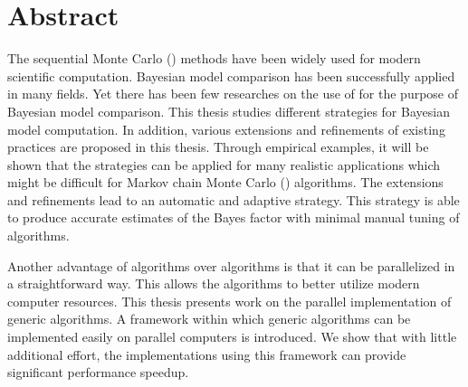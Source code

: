 \chapter*{Abstract}

The sequential Monte Carlo (\smc) methods have been widely used for modern
scientific computation. Bayesian model comparison has been successfully
applied in many fields. Yet there has been few researches on the use of \smc
for the purpose of Bayesian model comparison. This thesis studies different
\smc strategies for Bayesian model computation. In addition, various
extensions and refinements of existing \smc practices are proposed in this
thesis. Through empirical examples, it will be shown that the \smc strategies
can be applied for many realistic applications which might be difficult for
Markov chain Monte Carlo (\mcmc) algorithms. The extensions and refinements
lead to an automatic and adaptive strategy. This strategy is able to produce
accurate estimates of the Bayes factor with minimal manual tuning of
algorithms.

Another advantage of \smc algorithms over \mcmc algorithms is that it can be
parallelized in a straightforward way. This allows the algorithms to better
utilize modern computer resources. This thesis presents work on the parallel
implementation of generic \smc algorithms. A \cpp framework within which
generic \smc algorithms can be implemented easily on parallel computers is
introduced. We show that with little additional effort, the implementations
using this framework can provide significant performance speedup.
